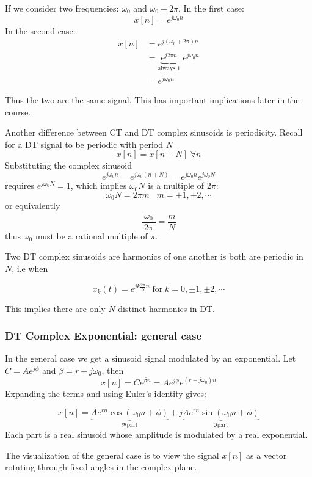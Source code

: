 If we consider two frequencies: $\omega_0$ and $\omega_0+2\pi$. In the first case:
\[
x[n] = e^{j\omega_0 n}
\]
In the second case:
\[
\begin{array}{ll}
x[n] &= e^{j(\omega_0+2\pi) n} \\
&= \underbrace{e^{j2\pi n}}_{\text{always 1}}\; e^{j\omega_0 n} \\
&= e^{j\omega_0 n}
\end{array}
\]

Thus the two are the same signal. This has important implications later in the course.

Another difference between CT and DT complex sinusoids is periodicity. Recall for a DT signal to be periodic with period $N$
\[
x[n] = x[n+N] \; \forall n
\]
Substituting the complex sinusoid
\[
e^{j\omega_0 n} = e^{j\omega_0 (n+N)} = e^{j\omega_0 n}e^{j\omega_0 N}
\]
requires $e^{j\omega_0 N} = 1$, which implies $\omega_0 N$ is a multiple of $2\pi$:
\[
\omega_0 N = 2\pi m \;\;\; m = \pm 1, \pm 2, \cdots
\]
or equivalently
\[
\frac{|\omega_0|}{2\pi} = \frac{m}{N}
\]
thus $\omega_0$ must be a rational multiple of $\pi$. 

Two DT complex sinusoids are harmonics of one another is both are periodic in $N$,  i.e when

\[
x_k(t) = e^{jk\frac{2\pi}{N} n} \; \text{for} \; k = 0, \pm 1, \pm 2, \cdots
\]

This implies there are only $N$ distinct harmonics in DT.


\subsubsection{DT Complex Exponential: general case}

In the general case we get a sinusoid signal modulated by an exponential. Let $C = Ae^{j\phi}$ and $\beta = r + j\omega_0$, then
\[
x[n] = C e^{\beta n} =  Ae^{j\phi} e^{(r+j\omega_0)n}
\]
Expanding the terms and using Euler's identity gives:

\[
x[n] = \underbrace{Ae^{rn}\cos(\omega_0 n+\phi)}_{\Re \text{part}} + j \underbrace{Ae^{rn}\sin(\omega_0 n+\phi)}_{\Im \text{part}}
\]
Each part is a real sinusoid whose amplitude is modulated by a real exponential.

The visualization of the general case is to view the signal $x[n]$ as a vector rotating through fixed angles in the complex plane.

